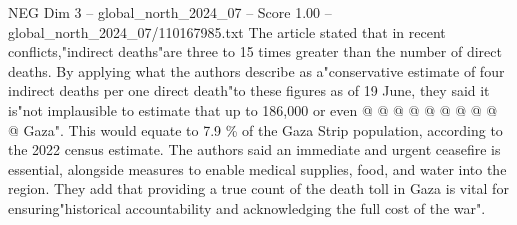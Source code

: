 \begin{textsample}{NEG Dim 3 – global\_north\_2024\_07 – Score 1.00 – global\_north\_2024\_07/110167985.txt}
The article stated that in recent conflicts,"indirect deaths"are three to 15 times greater than the number of direct deaths.
By applying what the authors describe as a"conservative estimate of four indirect deaths per one direct death"to these figures as of 19 June, they said it is"not implausible to estimate that up to 186,000 or even @ @ @ @ @ @ @ @ @ @ Gaza".
This would equate to 7.9 \% of the Gaza Strip population, according to the 2022 census estimate.
The authors said an immediate and urgent ceasefire is essential, alongside measures to enable medical supplies, food, and water into the region.
They add that providing a true count of the death toll in Gaza is vital for ensuring"historical accountability and acknowledging the full cost of the war".

\end{textsample}
